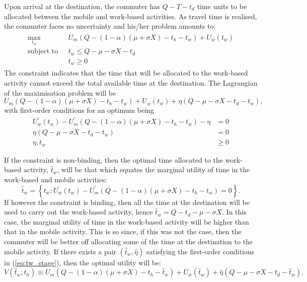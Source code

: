 \documentclass[12pt,a4paper,british]{article}
\begin{document}
Upon arrival at the destination, the commuter has $Q-T-t_{d}$ time units to be allocated between the mobile and work-based activities.
As travel time is realised, the commuter faces no uncertainty and his/her problem amounts to:
\begin{align}
\begin{split}
\max_{t_{w}} \quad & U_{m}\left(Q - \left(1 - \alpha\right) \left(\mu + \sigma X\right) - t_{h} - t_{w}\right) + U_{w}\left(t_{w}\right) \\
\mbox{subject to } \,\, & t_{w} \leq Q-\mu-\sigma X-t_{d} \\
 & t_w \geq 0 
\end{split}
\label{eq:secondStageProb}
\end{align}
The constraint indicates that the time that will be allocated to the work-based activity cannot exceed the total available time at the
destination. The Lagrangian of the maximisation problem will be%
\begin{equation*}
U_{m}\left(Q-\left(1-\alpha\right)\left(\mu+\sigma X\right)-t_{h}-t_{w}\right)+U_{w}\left(t_{w}\right)+\eta\left(Q-\mu-\sigma X-t_{d}-t_{w}\right),
\end{equation*}
with first-order conditions for an optimum being%
\begin{subequations}
\label{eq:tw_stage}
\begin{align}
U_{w}^{\prime}\left(t_{w}\right)-U_{m}^{\prime}\left(Q-\left(1-\alpha\right)\left(\mu+\sigma X\right)-t_{h}-t_{w}\right)-\eta & =0
\label{eq:stage2_wrt_tw}\\
\eta\left(Q-\mu-\sigma X-t_{d}-t_{w}\right) & =0\label{eq:stage2_compl}\\
\eta,t_{w} & \geq 0
\label{eq:stage2_nonnegative}
\end{align}
\end{subequations}

If the constraint is non-binding, then the optimal time allocated to the work-based activity, $\hat{t}_{w}$, will be that which equates the marginal utility of time in the work-based and mobile activities:
\begin{equation*}
\hat{t}_{w}=\left\{ t_{w}:U_{w}^{\prime}\left(t_{w}\right)-U_{m}^{\prime}\left(Q-\left(1-\alpha\right)\left(\mu+\sigma X\right)-t_{h}-t_{w}\right)=0\right\} .
\end{equation*}
If however the constraint is binding, then all the time at the destination will be used to carry out the work-based activity, hence $\hat{t}_{w}=Q-t_{d}-\mu-\sigma X$. In this case, the marginal utility of time in the work-based activity will be higher than that in the mobile activity. This is so since, if this was not the case, then the commuter will be better off allocating some of the time at the destination to the mobile activity. If there exists a pair $\left(\hat{t}_{w},\hat{\eta}\right)$ satisfying the first-order conditions in (\ref{eq:tw_stage}), then the optimal utility will be:
\begin{equation*}
V\left(\hat{t}_{w};t_{h}\right)\equiv U_{m}\left(Q-\left(1-\alpha\right)\left(\mu+\sigma X\right)-t_{h}-\hat{t}_{w}\right)+U_{w}\left(\hat{t}_{w}\right)+\hat{\eta}\left(Q-\mu-\sigma X-t_{d}-\hat{t}_{w}\right).
\end{equation*}
\end{document}
